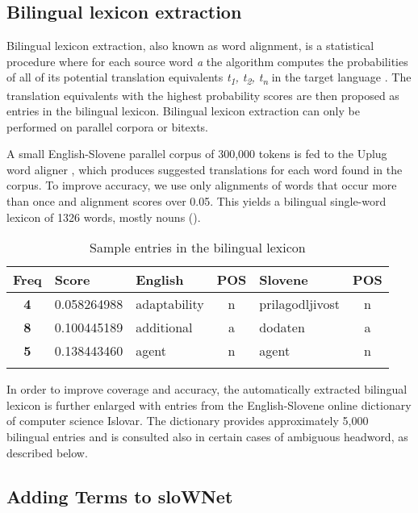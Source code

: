 \documentclass[output=paper]{LSP/langsci}
\begin{document}
\subsection{Bilingual lexicon extraction}\label{sec:vintar:4.1}

Bilingual lexicon extraction, also known as word alignment, is a statistical procedure where for each source word \textit{a} the algorithm computes the probabilities of all of its potential translation equivalents \textit{t}\textit{\textsubscript{1}}\textit{, t}\textit{\textsubscript{2}}\textit{, t}\textit{\textsubscript{n}} in the target language \citep{Och2003}. The translation equivalents with the highest probability scores are then proposed as entries in the bilingual lexicon. Bilingual lexicon extraction can only be performed on parallel corpora or bitexts. 

A small English-Slovene parallel corpus of 300,000 tokens is fed to the Uplug word aligner \citep{Tiedemann2003}, which produces suggested translations for each word found in the corpus. To improve accuracy, we use only alignments of words that occur more than once and alignment scores over 0.05. This yields a bilingual single-word lexicon of 1326 words, mostly nouns (). 

\begin{table}
\begin{tabular}{cllclc}
\lsptoprule
{\bfseries Freq} & \bfseries Score & \bfseries English & \bfseries POS & \bfseries Slovene & \bfseries POS\\
\midrule
\bfseries 4 & 0.058264988 & adaptability & n & prilagodljivost & n\\
\bfseries 8 & 0.100445189 & additional & a & dodaten & a\\
\bfseries 5 & 0.138443460 & agent & n & agent & n\\
\lspbottomrule
\end{tabular}
\caption{Sample entries in the bilingual lexicon}
\label{tab:vintar:4}
\end{table}

\newpage 
In order to improve coverage and accuracy, the automatically extracted bilingual lexicon is further enlarged with entries from the English-Slovene online dictionary of computer science Islovar. The dictionary provides approximately 5,000 bilingual entries and is consulted also in certain cases of ambiguous headword, as described below.

\subsection{Adding Terms to sloWNet}\label{sec:vintar:4.2}
\end{document}
